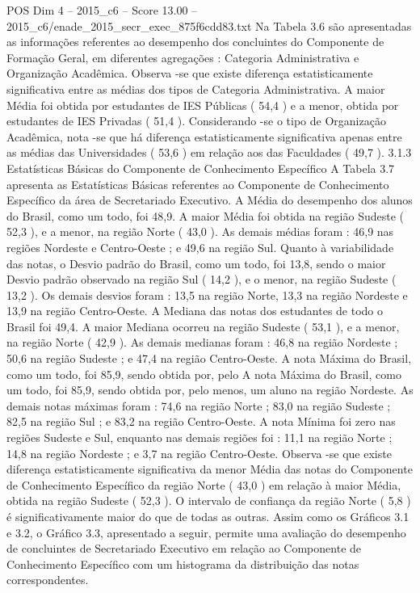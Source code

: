 \begin{textsample}{POS Dim 4 – 2015\_c6 – Score 13.00 – 2015\_c6/enade\_2015\_secr\_exec\_875f6cdd83.txt}
Na Tabela 3.6 são apresentadas as informações referentes ao desempenho dos concluintes do Componente de Formação Geral, em diferentes agregações : Categoria Administrativa e Organização Acadêmica.
Observa -se que existe diferença estatisticamente significativa entre as médias dos tipos de Categoria Administrativa.
A maior Média foi obtida por estudantes de IES Públicas ( 54,4 ) e a menor, obtida por estudantes de IES Privadas ( 51,4 ).
Considerando -se o tipo de Organização Acadêmica, nota -se que há diferença estatisticamente significativa apenas entre as médias das Universidades ( 53,6 ) em relação aos das Faculdades ( 49,7 ). 3.1.3 Estatísticas Básicas do Componente de Conhecimento Específico A Tabela 3.7 apresenta as Estatísticas Básicas referentes ao Componente de Conhecimento Específico da área de Secretariado Executivo.
A Média do desempenho dos alunos do Brasil, como um todo, foi 48,9.
A maior Média foi obtida na região Sudeste ( 52,3 ), e a menor, na região Norte ( 43,0 ).
As demais médias foram : 46,9 nas regiões Nordeste e Centro-Oeste ; e 49,6 na região Sul.
Quanto à variabilidade das notas, o Desvio padrão do Brasil, como um todo, foi 13,8, sendo o maior Desvio padrão observado na região Sul ( 14,2 ), e o menor, na região Sudeste ( 13,2 ).
Os demais desvios foram : 13,5 na região Norte, 13,3 na região Nordeste e 13,9 na região Centro-Oeste.
A Mediana das notas dos estudantes de todo o Brasil foi 49,4.
A maior Mediana ocorreu na região Sudeste ( 53,1 ), e a menor, na região Norte ( 42,9 ).
As demais medianas foram : 46,8 na região Nordeste ; 50,6 na região Sudeste ; e 47,4 na região Centro-Oeste.
A nota Máxima do Brasil, como um todo, foi 85,9, sendo obtida por, pelo A nota Máxima do Brasil, como um todo, foi 85,9, sendo obtida por, pelo menos, um aluno na região Nordeste.
As demais notas máximas foram : 74,6 na região Norte ; 83,0 na região Sudeste ; 82,5 na região Sul ; e 83,2 na região Centro-Oeste.
A nota Mínima foi zero nas regiões Sudeste e Sul, enquanto nas demais regiões foi : 11,1 na região Norte ; 14,8 na região Nordeste ; e 3,7 na região Centro-Oeste.
Observa -se que existe diferença estatisticamente significativa da menor Média das notas do Componente de Conhecimento Específico da região Norte ( 43,0 ) em relação à maior Média, obtida na região Sudeste ( 52,3 ).
O intervalo de confiança da região Norte ( 5,8 ) é significativamente maior do que de todas as outras.
Assim como os Gráficos 3.1 e 3.2, o Gráfico 3.3, apresentado a seguir, permite uma avaliação do desempenho de concluintes de Secretariado Executivo em relação ao Componente de Conhecimento Específico com um histograma da distribuição das notas correspondentes.

\end{textsample}
